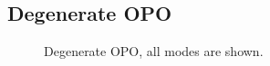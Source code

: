 

\subsection{Degenerate OPO}

\begin{figure}
	\centering
	\caption{Degenerate OPO, all modes are shown.}
	\label{fig:dOPO_config}
\end{figure}

